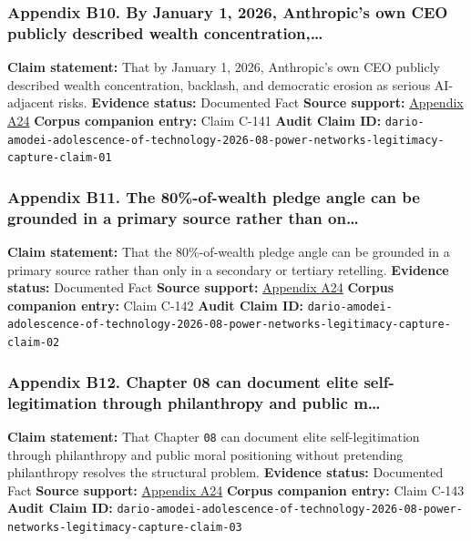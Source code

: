 \documentclass[
  american,
  11pt,
  letterpaper,
]{article}
\begin{document}
\subsubsection{Appendix B10. By January 1, 2026, Anthropic's own CEO
publicly described wealth
concentration,\ldots{}}\label{ch-10-appendix-b10-by-january-1-2026-anthropic-s-own-ceo-publicly-described-wealth-concentration}

\textbf{Claim statement:} That by January 1, 2026, Anthropic's own CEO
publicly described wealth concentration, backlash, and democratic
erosion as serious AI-adjacent risks. \textbf{Evidence status:}
Documented Fact \textbf{Source support:}
\hyperref[ch-10-appendix-a24-the-adolescence-of-technology]{Appendix
A24} \textbf{Corpus companion entry:} Claim C-141 \textbf{Audit Claim
ID:}
\texttt{dario-amodei-adolescence-of-technology-2026-08-power-networks-legitimacy-capture-claim-01}

\subsubsection{Appendix B11. The 80\%-of-wealth pledge angle can be
grounded in a primary source rather than
on\ldots{}}\label{ch-10-appendix-b11-the-80-of-wealth-pledge-angle-can-be-grounded-in-a-primary-source-rather-than-on}

\textbf{Claim statement:} That the 80\%-of-wealth pledge angle can be
grounded in a primary source rather than only in a secondary or tertiary
retelling. \textbf{Evidence status:} Documented Fact \textbf{Source
support:}
\hyperref[ch-10-appendix-a24-the-adolescence-of-technology]{Appendix
A24} \textbf{Corpus companion entry:} Claim C-142 \textbf{Audit Claim
ID:}
\texttt{dario-amodei-adolescence-of-technology-2026-08-power-networks-legitimacy-capture-claim-02}

\subsubsection{Appendix B12. Chapter 08 can document elite
self-legitimation through philanthropy and public
m\ldots{}}\label{ch-10-appendix-b12-chapter-08-can-document-elite-self-legitimation-through-philanthropy-and-public-m}

\textbf{Claim statement:} That Chapter \texttt{08} can document elite
self-legitimation through philanthropy and public moral positioning
without pretending philanthropy resolves the structural problem.
\textbf{Evidence status:} Documented Fact \textbf{Source support:}
\hyperref[ch-10-appendix-a24-the-adolescence-of-technology]{Appendix
A24} \textbf{Corpus companion entry:} Claim C-143 \textbf{Audit Claim
ID:}
\texttt{dario-amodei-adolescence-of-technology-2026-08-power-networks-legitimacy-capture-claim-03}
\end{document}
